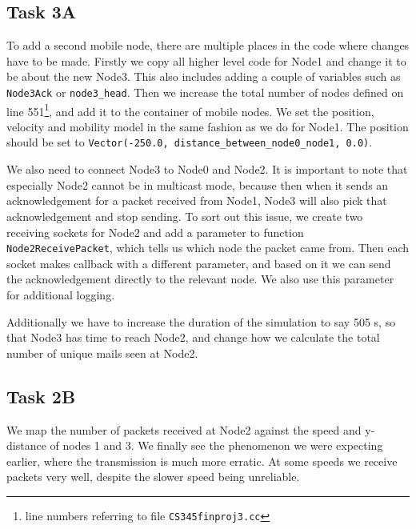 \documentclass[11pt,journal]{article}
\begin{document}
	\pagebreak
	\subsection{Task 3A}
	
	To add a second mobile node, there are multiple places in the code where changes have to be made. Firstly we copy all higher level code for Node1 and change it to be about the new Node3. This also includes adding a couple of variables such as \texttt{Node3Ack} or \texttt{node3\_head}. Then we increase the total number of nodes defined on line 551\footnote{line numbers referring to file \texttt{CS345finproj3.cc}}, and add it to the container of mobile nodes. We set the position, velocity and mobility model in the same fashion as we do for Node1. The position should be set to \texttt{Vector(-250.0, distance\_between\_node0\_node1, 0.0)}.
	
	We also need to connect Node3 to Node0 and Node2. It is important to note that especially Node2 cannot be in multicast mode, because then when it sends an acknowledgement for a packet received from Node1, Node3 will also pick that acknowledgement and stop sending. To sort out this issue, we create two receiving sockets for Node2 and add a parameter to function \texttt{Node2ReceivePacket}, which tells us which node the packet came from. Then each socket makes callback with a different parameter, and based on it we can send the acknowledgement directly to the relevant node. We also use this parameter for additional logging.
	
	Additionally we have to increase the duration of the simulation to say 505 s, so that Node3 has time to reach Node2, and change how we calculate the total number of unique mails seen at Node2.
	
	\subsection{Task 2B}
	We map the number of packets received at Node2 against the speed and y-distance of nodes 1 and 3. We finally see the phenomenon we were expecting earlier, where the transmission is much more erratic. At some speeds we receive packets very well, despite the slower speed being unreliable. 
	
\end{document}
